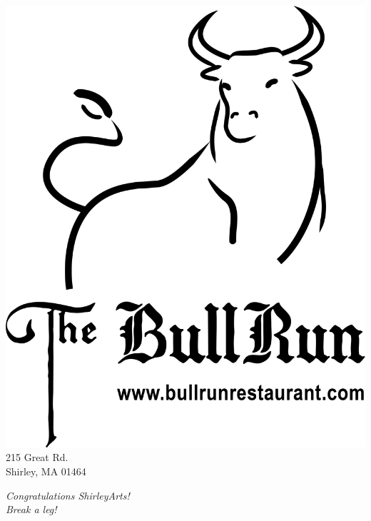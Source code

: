 \documentclass[12pt, a5paper, oneside]{article}
\begin{document}
\begin{framed}
\begin{minipage}[c][0.5\textheight]{0.4\linewidth}
	\centering
    \includegraphics[scale=0.05]{media/bull_logo_black_large.png}\\
    \small{215 Great Rd.\\
    Shirley, MA 01464}
\end{minipage}
\begin{minipage}[c][0.5\textheight]{0.4\linewidth}
\centering
   \Large \textit{Congratulations ShirleyArts!\\
   Break a leg!}
\end{minipage}
\end{framed}
\end{document}
